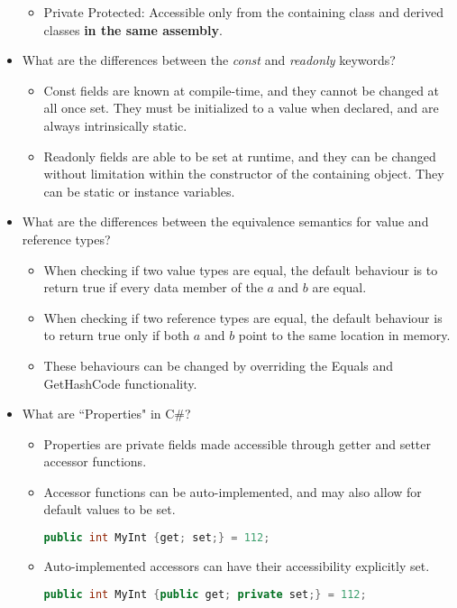\documentclass{article}
\begin{document}
\begin{itemize}
\begin{itemize}
        \item Private Protected: Accessible only from the containing class and derived classes \textbf{in the same assembly}.
    \end{itemize}
    \item What are the differences between the \textit{const} and \textit{readonly} keywords?
    \begin{itemize}
        \item Const fields are known at compile-time, and they cannot be changed at all once set. They must be initialized to a value when declared, and are always intrinsically static.
        \item Readonly fields are able to be set at runtime, and they can be changed without limitation within the constructor of the containing object. They can be static or instance variables.
    \end{itemize}
    \item What are the differences between the equivalence semantics for value and reference types?
    \begin{itemize}
        \item When checking if two value types are equal, the default behaviour is to return true if every data member of the $a$ and $b$ are equal.
        \item When checking if two reference types are equal, the default behaviour is to return true only if both $a$ and $b$ point to the same location in memory.
        \item These behaviours can be changed by overriding the Equals and GetHashCode functionality.
    \end{itemize}
    \item What are ``Properties" in C\#?
    \begin{itemize}
        \item Properties are private fields made accessible through getter and setter accessor functions.
        \item Accessor functions can be auto-implemented, and may also allow for default values to be set.
        \begin{lstlisting}[language=C++]
                public int MyInt {get; set;} = 112; \end{lstlisting} 
        \item Auto-implemented accessors can have their accessibility explicitly set.
        \begin{lstlisting}[language=C++]
                public int MyInt {public get; private set;} = 112; \end{lstlisting}

\end{itemize}
\end{itemize}
\end{document}

